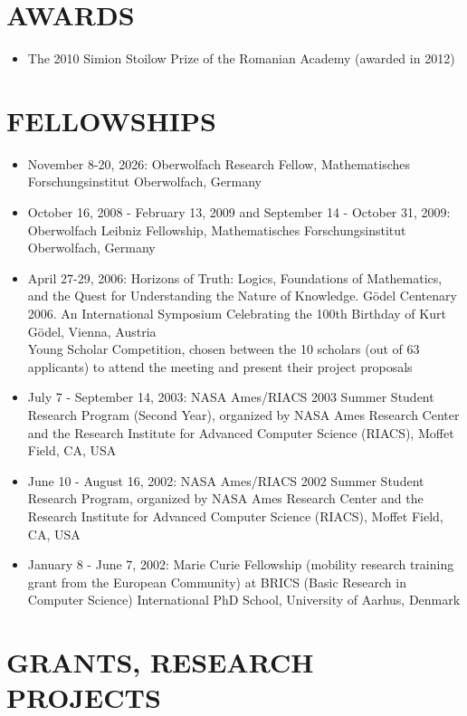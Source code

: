 \documentclass[12pt]{article}
\begin{document}
\section*{AWARDS}

\begin{itemize}
\item  The 2010 Simion Stoilow Prize of the Romanian Academy (awarded in 2012)
\end{itemize}

\section*{FELLOWSHIPS}
\begin{itemize}
\item November 8-20, 2026: Oberwolfach Research Fellow,  Mathematisches Forschungsinstitut Oberwolfach, Germany
\item October 16, 2008 - February 13, 2009 and  September 14  - October 31, 2009: 
Oberwolfach Leibniz Fellowship,  Mathematisches Forschungsinstitut Oberwolfach, Germany
\item April 27-29, 2006:
Horizons of Truth: Logics, Foundations of Mathematics, and the Quest for Understanding the Nature of Knowledge. G\" odel Centenary 2006. An International Symposium Celebrating the 100th Birthday of Kurt G\" odel, Vienna, Austria\\
Young Scholar Competition, chosen between the 10 scholars (out of 63 applicants) to attend the meeting and  present their project proposals
\item  July 7 - September 14, 2003:
NASA Ames/RIACS 2003 Summer Student Research Program (Second Year), organized by NASA Ames Research
Center and the Research Institute for Advanced Computer Science (RIACS), Moffet Field, CA, USA
\item June 10 - August 16, 2002:
NASA Ames/RIACS 2002 Summer Student Research Program, organized by NASA Ames Research Center and the 
Research Institute for Advanced Computer Science (RIACS), Moffet Field, CA, USA
\item
January 8 - June 7, 2002:
Marie Curie Fellowship (mobility research training grant from the European Community) at 
BRICS (Basic Research in Computer Science) International PhD School, University of Aarhus, Denmark
\end{itemize}


\section*{GRANTS, RESEARCH PROJECTS}
\end{document}
